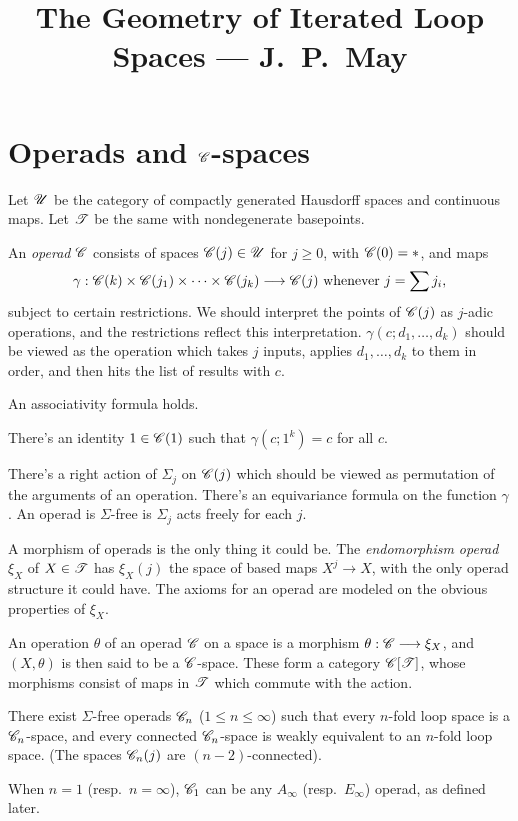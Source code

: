 \documentclass[11pt]{article}
\title{The Geometry of Iterated Loop Spaces\small{ --- J.\ P.\ May}}
\author{}
\date{}
\begin{document}

\section{Operads and \texorpdfstring{$\mathscr{C}$}{C}-spaces}
Let $\mathscr{U}$ be the category of compactly generated Hausdorff spaces and continuous
 maps. 
Let $\mathscr{T}$ be the same with nondegenerate basepoints.

An \emph{operad} $\mathscr{C}$ consists of spaces $\mathscr{C}(j)\in\mathscr{U}$ for $j\geq0$,
 with $\mathscr{C}(0)=*$, and maps
\[\gamma:\mathscr{C}(k)\times\mathscr{C}(j_1)\times\cdots\times\mathscr{C}(j_k)\longrightarrow\mathscr{C}(j)
\text{ whenever }j=\sum j_i,\]
subject to certain restrictions. We should interpret the points of $\mathscr{C}(j)$ as
$j$-adic operations, and the restrictions reflect this interpretation.
$\gamma(c;d_1,\ldots,d_k)$ should be viewed as the operation which takes $j$
inputs, applies $d_1,\ldots,d_k$ to them in order, and then hits the list of
results with $c$.
\begin{itemise}
\item An associativity formula holds.
\item There's an identity $1\in\mathscr{C}(1)$ such that $\gamma(c;1^k)=c$ for all $c$.
\item There's a right action of $\Sigma_j$ on $\mathscr{C}(j)$ which should be viewed as
permutation of the arguments of an operation. There's an equivariance formula on
the function $\gamma$. An operad is $\Sigma$-free is $\Sigma_j$ acts freely for
each $j$.
\end{itemise}
A morphism of operads is the only thing it could be. The \emph{endomorphism
operad} $\xi_X$ of $X\in\mathscr{T}$ has $\xi_X(j)$ the space of based maps $X^j\to
X$, with the only operad structure it could have. The axioms for an operad are
modeled on the obvious properties of $\xi_X$.

An operation $\theta$ of an operad $\mathscr{C}$ on a space is a morphism
$\theta:\mathscr{C}\longrightarrow\xi_X$, and $(X,\theta)$ is then said to be a $\mathscr{C}$-space. These
form a category $\mathscr{C}[\mathscr{T}]$, whose morphisms consist of maps in $\mathscr{T}$ which
commute with the action.
\begin{thm*}[1.3]
There exist $\Sigma$-free operads $\mathscr{C}_n$ ($1\leq n\leq\infty$) such that every
$n$-fold loop space is a $\mathscr{C}_n$-space, and every connected $\mathscr{C}_n$-space
is weakly equivalent to an $n$-fold loop space. (The spaces $\mathscr{C}_n(j)$ are 
$(n-2)$-connected).
\end{thm*}
When $n=1$  (resp.\ $n=\infty$), $\mathscr{C}_1$ can be any $A_\infty$ 
(resp.\ $E_\infty$) operad, as defined later.
\end{document}
